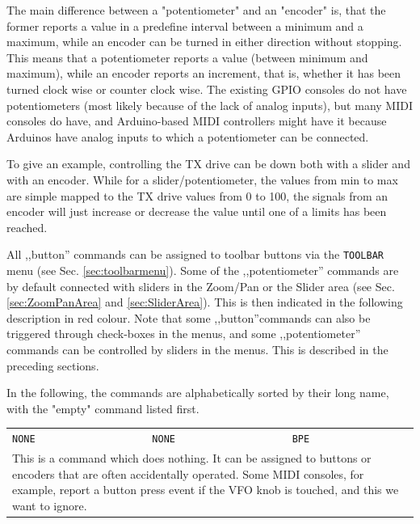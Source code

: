 \documentclass[12pt]{book}
\def\bltt#1{\texttt{\color{blue}#1}}
\begin{document}
The main difference between a "potentiometer" and an "encoder" is, that the former reports a
value in a predefine interval between a minimum and a maximum,
while
an encoder can be turned in either direction without stopping. This means that a potentiometer
reports a value (between minimum and maximum), while an encoder reports an increment,
that is, whether it has been turned clock wise or counter clock wise.
The existing GPIO consoles do not have potentiometers (most likely because of the lack of analog inputs),
but many MIDI consoles do have, and Arduino-based MIDI controllers might have it because Arduinos have
analog inputs to which a potentiometer can be connected.

To give an example, controlling the TX drive can be down both with a slider and with an encoder. While for
a slider/potentiometer, the values from min to max are simple mapped to the TX drive values from 0 to 100,
the signals from an encoder will just increase or decrease the value until one of a limits has been reached.

All ,,button'' commands can be assigned to toolbar buttons via the \bltt{TOOLBAR} menu
(see Sec. \ref{sec:toolbarmenu}). Some of the ,,potentiometer'' commands are by default connected
with sliders in the Zoom/Pan or the Slider area (see Sec. \ref{sec:ZoomPanArea} and \ref{sec:SliderArea}).
This is then indicated in the following description in red colour. Note that some ,,button''commands
can also be triggered through check-boxes in the menus, and some ,,potentiometer'' commands can be controlled
by sliders in the menus. This is described in the preceding sections.

In the following, the commands are alphabetically sorted by their long name, with the "empty" command listed
first.

\renewcommand{\belowrulesep}{0pt}
\renewcommand{\aboverulesep}{0pt}
\def\phcommand#1#2#3#4{
\begin{center}
\begin{tabular}{|p{7cm}|p{3cm}|p{1cm}|}
\toprule
\bltt{\large #1} & \texttt{\large #2} & \texttt{\large #3}$\phantom{\Big|}$ \\\cline{1-3}
\multicolumn{3}{|p{\textwidth}|}{#4} \\
\bottomrule
\end{tabular}
\end{center}
}


\phcommand{NONE}{NONE}{BPE}{This is a command which does nothing. It can be assigned to buttons or enco\-ders
that
are often accidentally operated. Some MIDI consoles, for example, report a button press event if the VFO
knob is touched, and this we want to ignore.}
\end{document}
